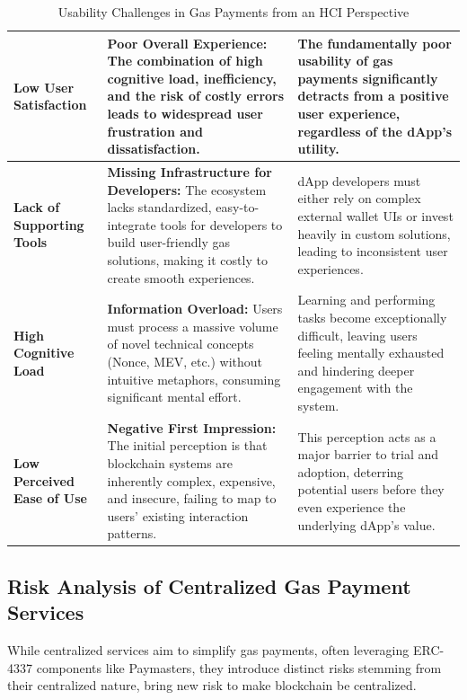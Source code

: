 \documentclass[preprint,12pt]{elsarticle}
\begin{document}
\begin{table}[htbp]
\begin{tabularx}{\textwidth}{|p{2.5cm}|X|X|}
\hline
\textbf{Low User Satisfaction} & \textbf{Poor Overall Experience:} The combination of high cognitive load, inefficiency, and the risk of costly errors leads to widespread user frustration and dissatisfaction. & The fundamentally poor usability of gas payments significantly detracts from a positive user experience, regardless of the dApp's utility. \\
\hline
\textbf{Lack of Supporting Tools} & \textbf{Missing Infrastructure for Developers:} The ecosystem lacks standardized, easy-to-integrate tools for developers to build user-friendly gas solutions, making it costly to create smooth experiences. & dApp developers must either rely on complex external wallet UIs or invest heavily in custom solutions, leading to inconsistent user experiences. \\
\hline
\textbf{High Cognitive Load} & \textbf{Information Overload:} Users must process a massive volume of novel technical concepts (Nonce, MEV, etc.) without intuitive metaphors, consuming significant mental effort. & Learning and performing tasks become exceptionally difficult, leaving users feeling mentally exhausted and hindering deeper engagement with the system. \\
\hline
\textbf{Low Perceived Ease of Use} & \textbf{Negative First Impression:} The initial perception is that blockchain systems are inherently complex, expensive, and insecure, failing to map to users' existing interaction patterns. & This perception acts as a major barrier to trial and adoption, deterring potential users before they even experience the underlying dApp's value. \\
\hline
\end{tabularx}
\caption{Usability Challenges in Gas Payments from an HCI Perspective}
\label{tab:usability-challenges}
\end{table}

\subsection{Risk Analysis of Centralized Gas Payment Services}
\label{subsec:centralized-risks}

While centralized services aim to simplify gas payments, often leveraging ERC-4337 components like Paymasters, they introduce distinct risks stemming from their centralized nature, bring new risk to make blockchain be centralized.
\end{document}
